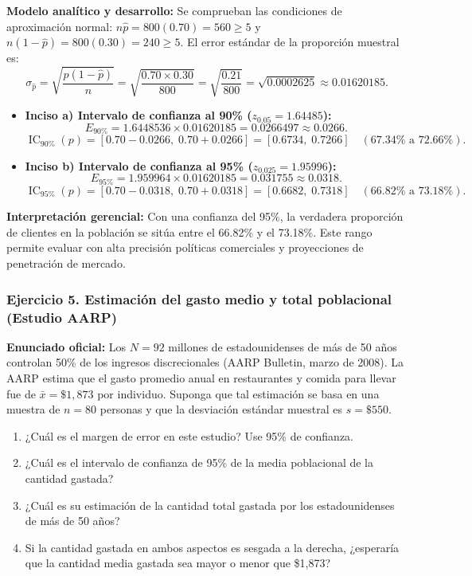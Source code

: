 {\textbf{Modelo analítico y desarrollo:}
Se comprueban las condiciones de aproximación normal: $n\hat{p} = 800(0.70) = 560 \ge 5$ y $n(1-\hat{p}) = 800(0.30) = 240 \ge 5$. El error estándar de la proporción muestral es:
\[
  \sigma_{\hat{p}} = \sqrt{\frac{\hat{p}(1-\hat{p})}{n}} = \sqrt{\frac{0.70 \times 0.30}{800}} = \sqrt{\frac{0.21}{800}} = \sqrt{0.0002625} \approx 0.01620185.
\]
\begin{itemize}
  \item \textbf{Inciso a) Intervalo de confianza al 90\% ($z_{0.05} = 1.64485$):}
  \[
    E_{90\%} = 1.6448536 \times 0.01620185 = 0.0266497 \approx 0.0266.
  \]
  \[
    \operatorname{IC}_{90\%}(p) = [0.70 - 0.0266, \; 0.70 + 0.0266] = [0.6734, \; 0.7266] \quad (67.34\% \text{ a } 72.66\%).
  \]
  \item \textbf{Inciso b) Intervalo de confianza al 95\% ($z_{0.025} = 1.95996$):}
  \[
    E_{95\%} = 1.959964 \times 0.01620185 = 0.031755 \approx 0.0318.
  \]
  \[
    \operatorname{IC}_{95\%}(p) = [0.70 - 0.0318, \; 0.70 + 0.0318] = [0.6682, \; 0.7318] \quad (66.82\% \text{ a } 73.18\%).
  \]
\end{itemize}
\textbf{Interpretación gerencial:} Con una confianza del 95\%, la verdadera proporción de clientes en la población se sitúa entre el 66.82\% y el 73.18\%. Este rango permite evaluar con alta precisión políticas comerciales y proyecciones de penetración de mercado.

\subsubsection*{Ejercicio 5. Estimación del gasto medio y total poblacional (Estudio AARP)}
\textbf{Enunciado oficial:} Los $N = 92$ millones de estadounidenses de más de 50 años controlan 50\% de los ingresos discrecionales (AARP Bulletin, marzo de 2008). La AARP estima que el gasto promedio anual en restaurantes y comida para llevar fue de $\bar{x} = \$1,873$ por individuo. Suponga que tal estimación se basa en una muestra de $n = 80$ personas y que la desviación estándar muestral es $s = \$550$.
\begin{enumerate}
  \item ¿Cuál es el margen de error en este estudio? Use 95\% de confianza.
  \item ¿Cuál es el intervalo de confianza de 95\% de la media poblacional de la cantidad gastada?
  \item ¿Cuál es su estimación de la cantidad total gastada por los estadounidenses de más de 50 años?
  \item Si la cantidad gastada en ambos aspectos es sesgada a la derecha, ¿esperaría que la cantidad media gastada sea mayor o menor que \$1,873?
\end{enumerate}

}

